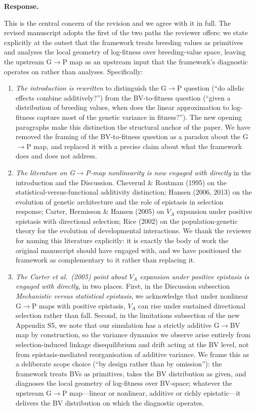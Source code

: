 \documentclass[11pt,a4paper]{article}
\newcommand{\response}{%
  \par\medskip\noindent\textbf{\color{ResponseColor}Response.}\quad\ignorespaces
}
\begin{document}
\response
This is the central concern of the revision and we agree with it in full. The revised manuscript adopts the first of the two paths the reviewer offers: we state explicitly at the outset that the framework treats breeding values as primitives and analyses the local geometry of log-fitness over breeding-value space, leaving the upstream G$\to$P map as an upstream input that the framework's diagnostic operates on rather than analyses. Specifically:

\begin{enumerate}[leftmargin=*]

\item \textit{The introduction is rewritten} to distinguish the G$\to$P question (``do allelic effects combine additively?'') from the BV-to-fitness question (``given a distribution of breeding values, when does the linear approximation to log-fitness capture most of the genetic variance in fitness?''). The new opening paragraphs make this distinction the structural anchor of the paper. We have removed the framing of the BV-to-fitness question as a paradox about the G$\to$P map, and replaced it with a precise claim about what the framework does and does not address.

\item \textit{The literature on G$\to$P-map nonlinearity is now engaged with directly} in the introduction and the Discussion. Cheverud \& Routman (1995) on the statistical-versus-functional additivity distinction; Hansen (2006, 2013) on the evolution of genetic architecture and the role of epistasis in selection response; Carter, Hermisson \& Hansen (2005) on $V_A$ expansion under positive epistasis with directional selection; Rice (2002) on the population-genetic theory for the evolution of developmental interactions. We thank the reviewer for naming this literature explicitly: it is exactly the body of work the original manuscript should have engaged with, and we have positioned the framework as complementary to it rather than replacing it.

\item \textit{The Carter et al.\ (2005) point about $V_A$ expansion under positive epistasis is engaged with directly}, in two places. First, in the Discussion subsection \textit{Mechanistic versus statistical epistasis}, we acknowledge that under nonlinear G$\to$P maps with positive epistasis, $V_A$ can rise under sustained directional selection rather than fall. Second, in the limitations subsection of the new Appendix S5, we note that our simulation has a strictly additive G$\to$BV map by construction, so the variance dynamics we observe arise entirely from selection-induced linkage disequilibrium and drift acting at the BV level, not from epistasis-mediated reorganisation of additive variance. We frame this as a deliberate scope choice (``by design rather than by omission''): the framework treats BVs as primitives, takes the BV distribution as given, and diagnoses the local geometry of log-fitness over BV-space; whatever the upstream G$\to$P map---linear or nonlinear, additive or richly epistatic---it delivers the BV distribution on which the diagnostic operates.


\end{enumerate}
\end{document}
